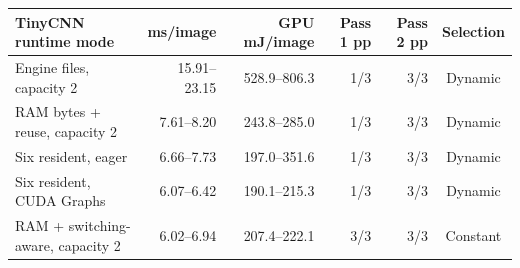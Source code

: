\begin{tabularx}{\linewidth}{@{}Xrrrrc@{}}
\toprule
TinyCNN runtime mode & ms/image & GPU mJ/image & Pass 1 pp & Pass 2 pp & Selection\\
\midrule
Engine files, capacity 2 & 15.91--23.15 & 528.9--806.3 & 1/3 & 3/3 & Dynamic\\
RAM bytes + reuse, capacity 2 & 7.61--8.20 & 243.8--285.0 & 1/3 & 3/3 & Dynamic\\
Six resident, eager & 6.66--7.73 & 197.0--351.6 & 1/3 & 3/3 & Dynamic\\
Six resident, CUDA Graphs & 6.07--6.42 & 190.1--215.3 & 1/3 & 3/3 & Dynamic\\
RAM + switching-aware, capacity 2 & 6.02--6.94 & 207.4--222.1 & 3/3 & 3/3 & Constant\\
\bottomrule
\end{tabularx}
